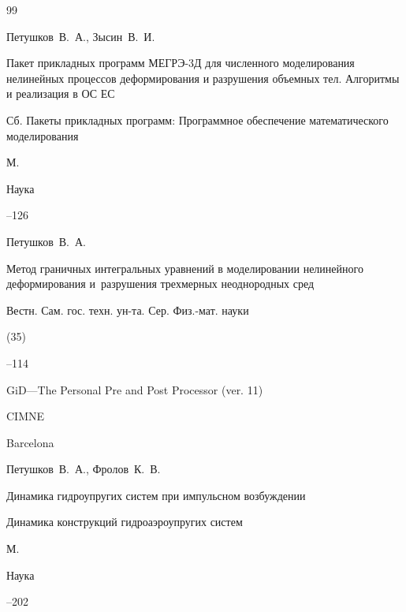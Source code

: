 \begin{thebibliography}{99}




\by Петушков~В.~А., Зысин~В.~И.

\paper Пакет прикладных программ МЕГРЭ-3Д для численного моделирования нелинейных процессов деформирования и разрушения объемных тел. Алгоритмы и реализация в ОС ЕС

\inbook Сб. Пакеты прикладных программ: Программное обеспечение математического моделирования

\publaddr М.

\publ Наука


--126









\by Петушков~В.~А.

\paper Метод граничных интегральных уравнений в моделировании нелинейного деформирования и~разрушения трехмерных неоднородных сред

\jour Вестн. Сам. гос. техн. ун-та. Сер. Физ.-мат. науки


(35)

--114







\book  GiD---The Personal Pre and Post Processor (ver. 11)

\publ CIMNE

\publaddr Barcelona





\by Петушков~В.~А., Фролов~К.~В.

\paper Динамика гидроупругих систем при импульсном возбуждении

\inbook Динамика конструкций гидроаэроупругих систем

\publaddr М.

\publ Наука


--202



\end{thebibliography}



